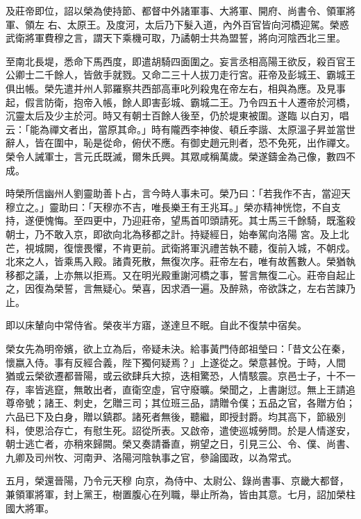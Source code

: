 \begin{pinyinscope}
 及莊帝即位，詔以榮為使持節、都督中外諸軍事、大將軍、開府、尚書令、領軍將軍、領左
 右、太原王。及度河，太后乃下髮入道，內外百官皆向河橋迎駕。榮惑武衛將軍費穆之言，謂天下乘機可取，乃譎朝士共為盟誓，將向河陰西北三里。



 至南北長堤，悉命下馬西度，即遣胡騎四面圍之。妄言丞相高陽王欲反，殺百官王公卿士二千餘人，皆斂手就戮。又命二三十人拔刀走行宮。莊帝及彭城王、霸城王俱出帳。榮先遣并州人郭羅察共西部高車叱列殺鬼在帝左右，相與為應。及見事起，假言防衛，抱帝入帳，餘人即害彭城、霸城二王。乃令四五十人遷帝於河橋，沉靈太后及少主於河。時又有朝士百餘人後至，仍於堤東被圍。遂臨
 以白刃，唱云：「能為禪文者出，當原其命。」時有隴西李神俊、頓丘李諧、太原溫子昇並當世辭人，皆在圍中，恥是從命，俯伏不應。有御史趙元則者，恐不免死，出作禪文。榮令人誡軍士，言元氏既滅，爾朱氏興。其眾咸稱萬歲。榮遂鑄金為己像，數四不成。



 時榮所信幽州人劉靈助善卜占，言今時人事未可。榮乃曰：「若我作不吉，當迎天穆立之。」靈助曰：「天穆亦不吉，唯長樂王有王兆耳。」榮亦精神恍惚，不自支持，遂便愧悔。至四更中，乃迎莊帝，望馬首叩頭請死。其士馬三千餘騎，既濫殺朝士，乃不敢入京，即欲向北為移都之計。持疑經日，始奉駕向洛陽
 宮。及上北芒，視城闕，復懷畏懼，不肯更前。武衛將軍汎禮苦執不聽，復前入城，不朝戍。北來之人，皆乘馬入殿。諸貴死散，無復次序。莊帝左右，唯有故舊數人。榮猶執移都之議，上亦無以拒焉。又在明光殿重謝河橋之事，誓言無復二心。莊帝自起止之，因復為榮誓，言無疑心。榮喜，因求酒一遍。及醉熟，帝欲誅之，左右苦諫乃止。



 即以床輦向中常侍省。榮夜半方寤，遂達旦不眠。自此不復禁中宿矣。



 榮女先為明帝嬪，欲上立為后，帝疑未決。給事黃門侍郎祖瑩曰：「昔文公在秦，懷嬴入侍。事有反經合義，陛下獨何疑焉？」上遂從之。榮意甚悅。于時，人間
 猶或云榮欲遷都晉陽，或云欲肆兵大掠，迭相驚恐，人情駭震。京邑士子，十不一存，率皆逃竄，無敢出者，直衛空虛，官守廢曠。榮聞之，上書謝愆。無上王請追尊帝號；諸王、刺史，乞贈三司；其位班三品，請贈令僕；五品之官，各贈方伯；六品已下及白身，贈以鎮郡。諸死者無後，聽繼，即授封爵。均其高下，節級別科，使恩洽存亡，有慰生死。詔從所表。又啟帝，遣使巡城勞問。於是人情遂安，朝士逃亡者，亦稍來歸闕。榮又奏請番直，朔望之日，引見三公、令、僕、尚書、九卿及司州牧、河南尹、洛陽河陰執事之官，參論國政，以為常式。



 五月，榮還晉陽，乃令元天穆
 向京，為侍中、太尉公、錄尚書事、京畿大都督，兼領軍將軍，封上黨王，樹置腹心在列職，舉止所為，皆由其意。七月，詔加榮柱國大將軍。




\end{pinyinscope}
